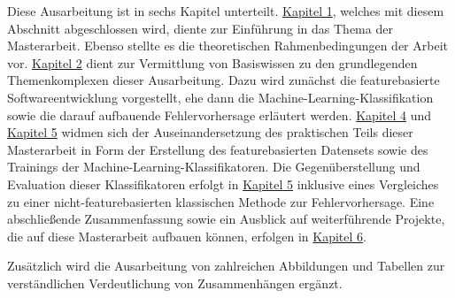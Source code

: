 Diese Ausarbeitung ist in sechs Kapitel unterteilt. \hyperref[introduction]{Kapitel 1}, welches mit diesem Abschnitt abgeschlossen wird, diente zur Einführung in das Thema der Masterarbeit. Ebenso stellte es die theoretischen Rahmenbedingungen der Arbeit vor. \hyperref[background]{Kapitel 2} dient zur Vermittlung von Basiswissen zu den grundlegenden Themenkomplexen dieser Ausarbeitung. Dazu wird zunächst die featurebasierte Softwareentwicklung vorgestellt, ehe dann die Machine-Learning-Klassifikation sowie die darauf aufbauende Fehlervorhersage erläutert werden. \hyperref[dataset-creation]{Kapitel 4} und \hyperref[training]{Kapitel 5} widmen sich der Auseinandersetzung des praktischen Teils dieser Masterarbeit in Form der Erstellung des featurebasierten Datensets sowie des Trainings der Machine-Learning-Klassifikatoren. Die Gegenüberstellung und Evaluation dieser Klassifikatoren erfolgt in \hyperref[evaluation]{Kapitel 5} inklusive eines Vergleiches zu einer nicht-featurebasierten klassischen Methode zur Fehlervorhersage. Eine abschließende Zusammenfassung sowie ein Ausblick auf weiterführende Projekte, die auf diese Masterarbeit aufbauen können, erfolgen in \hyperref[conclusion]{Kapitel 6}.

Zusätzlich wird die Ausarbeitung von zahlreichen Abbildungen und Tabellen zur verständlichen Verdeutlichung von Zusammenhängen ergänzt.

\cleardoublepage
